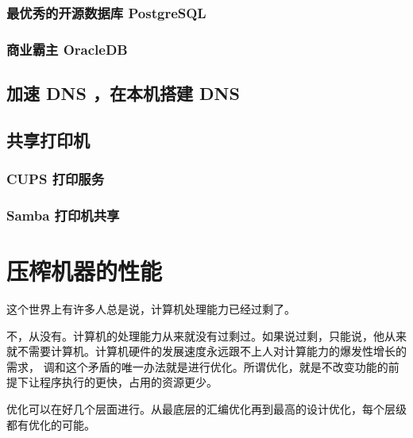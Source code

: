\documentclass[amstex,twoside]{ctexbook}
\begin{document}
\subsection{  最优秀的开源数据库 PostgreSQL 	}
\subsection{  商业霸主 OracleDB	}
\section{  加速 DNS ，在本机搭建 DNS	}
\section{  共享打印机	}
\subsection{ CUPS 打印服务	}
\subsection{ Samba 打印机共享	}


\chapter{压榨机器的性能}

这个世界上有许多人总是说，计算机处理能力已经过剩了。

不，从没有。计算机的处理能力从来就没有过剩过。如果说过剩，只能说，他从来就不需要计算机。计算机硬件的发展速度永远跟不上人对计算能力的爆发性增长的需求，
调和这个矛盾的唯一办法就是进行优化。所谓优化，就是不改变功能的前提下让程序执行的更快，占用的资源更少。

优化可以在好几个层面进行。从最底层的汇编优化再到最高的设计优化，每个层级都有优化的可能。
\end{document}
